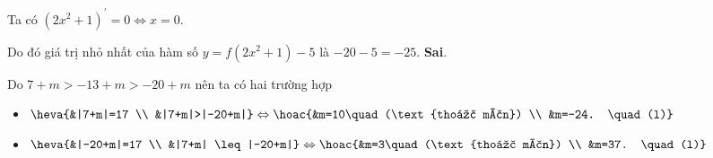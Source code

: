 \begin{ex}
{\begin{itemchoice}
 Ta có $\left(2 x^2+1\right)^{\prime}=0 \Leftrightarrow x=0$. 
\begin{center}
\end{center}
Do đó giá trị nhỏ nhất của hàm số $y=f\left(2 x^2+1\right)-5$ là $-20-5=-25$.
			\itemch \textbf{Sai}.
		\begin{center}
		\end{center}
		Do $7+m>-13+m>-20+m$ nên ta có hai trường hợp
\begin{itemize}
	\item  $\heva{&|7+m|=17 \\ &|7+m|>|-20+m|} \Leftrightarrow \hoac{&m=10\quad(\text{thoả mãn}) \\ &m=-24. \quad(l)}$
\item  $\heva{&|-20+m|=17 \\ 
	&|7+m| \leq|-20+m|} \Leftrightarrow \hoac{&m=3\quad(\text{thoả mãn}) \\ &m=37. \quad(l)}$
\end{itemize}
		\end{itemchoice}
	}
\end{ex}
